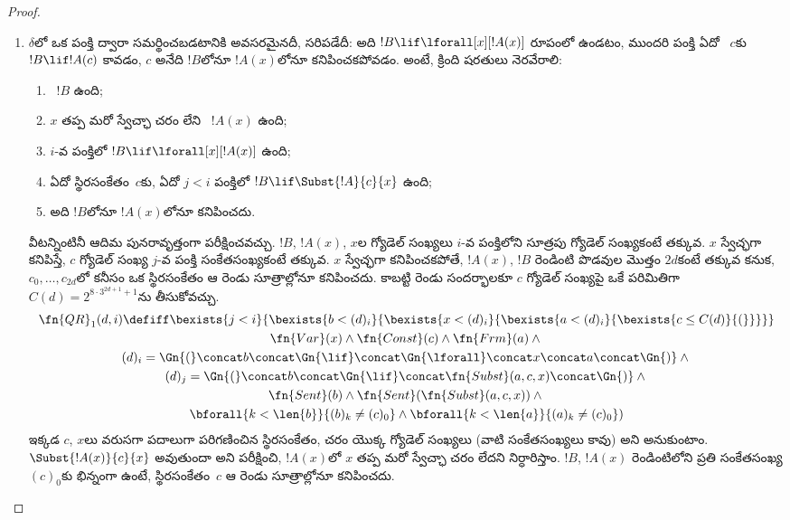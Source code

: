 \documentclass[../../../include/open-logic-section]{subfiles}
\begin{document}
\begin{proof}
\begin{enumerate}
  వాక్యం $!A\lif !B$, $i$-వ పంక్తిలోని వాక్యం $!B$ కావడం.
  \begin{multline*}
    \fn{MP}(d,i)\defiff\bexists{j<i}{\bexists{k<i}{}}\\
    (d)_k=\Gn{(}\concat(d)_j
      \concat\Gn{\lif}\concat(d)_i\concat\Gn{)}
  \end{multline*}
  పరిమిత పరిమాణీకరణ, సంయోజనం, $=$ అన్నీ ఆదిమ పునరావృత్తం కనుక, ఇది
  ఒక ఆదిమ పునరావృత్త సంబంధాన్ని నిర్వచిస్తుంది.
\item $\delta$లో ఒక పంక్తి \QR{} ద్వారా సమర్థించబడటానికి అవసరమైనదీ,
  సరిపడేదీ: అది $!B\lif\lforall[x][!A(x)]$ రూపంలో ఉండటం, ముందరి పంక్తి
  ఏదో ~$c$కు $!B\lif !A(c)$ కావడం,
  $c$ అనేది $!B$లోనూ $!A(x)$లోనూ కనిపించకపోవడం. అంటే, క్రింది షరతులు నెరవేరాలి:
  \begin{enumerate}
  \item {}~$!B$ ఉంది;
  \item $x$ తప్ప మరో స్వేచ్ఛా చరం లేని
    ~$!A(x)$ ఉంది;
  \item $i$-వ పంక్తిలో $!B\lif\lforall[x][!A(x)]$ ఉంది;
  \item ఏదో స్థిరసంకేతం~$c$కు, ఏదో $j<i$ పంక్తిలో
    $!B\lif\Subst{!A}{c}{x}$ ఉంది;
  \item అది $!B$లోనూ $!A(x)$లోనూ కనిపించదు.
  \end{enumerate}
  వీటన్నింటినీ ఆదిమ పునరావృత్తంగా పరీక్షించవచ్చు. $!B$, $!A(x)$, $x$ల
  గ్యోడెల్ సంఖ్యలు $i$-వ పంక్తిలోని సూత్రపు గ్యోడెల్ సంఖ్యకంటే తక్కువ.
  $x$ స్వేచ్ఛగా కనిపిస్తే, $c$ గ్యోడెల్ సంఖ్య $j$-వ పంక్తి సంకేతసంఖ్యకంటే
  తక్కువ. $x$ స్వేచ్ఛగా కనిపించకపోతే, $!A(x)$, $!B$ రెండింటి పొడవుల
  మొత్తం $2d$కంటే తక్కువ కనుక, $c_0,\dots,c_{2d}$లో కనీసం ఒక
  స్థిరసంకేతం ఆ రెండు సూత్రాల్లోనూ కనిపించదు. కాబట్టి రెండు సందర్భాలకూ
  $c$ గ్యోడెల్ సంఖ్యపై ఒకే పరిమితిగా $C(d)=2^{8\cdot3^{2d+1}+1}$ను
  తీసుకోవచ్చు.
  \begin{multline*}
    \fn{QR}_1(d,i)\defiff\bexists{j<i}{\bexists{b<(d)_i}{\bexists{x<(d)_i}{
        \bexists{a<(d)_i}{\bexists{c\leq C(d)}{(}}}}}\\
    \fn{Var}(x)\land\fn{Const}(c)\land\fn{Frm}(a)\land{}\\
    (d)_i=\Gn{(}\concat
    b\concat\Gn{\lif}\concat\Gn{\lforall}\concat x\concat a
    \concat\Gn{)}\land{}\\
    (d)_j=\Gn{(}\concat b\concat
    \Gn{\lif}\concat\fn{Subst}(a,c,x)\concat\Gn{)}\land{}\\
    \fn{Sent}(b)\land\fn{Sent}(\fn{Subst}(a,c,x))\land{}\\
    \bforall{k<\len{b}}{(b)_k\neq(c)_0}\land
    \bforall{k<\len{a}}{(a)_k\neq(c)_0})
  \end{multline*}
  ఇక్కడ $c$, $x$లు వరుసగా పదాలుగా పరిగణించిన స్థిరసంకేతం, చరం యొక్క
  గ్యోడెల్ సంఖ్యలు (వాటి సంకేతసంఖ్యలు కావు) అని అనుకుంటాం.
  $\Subst{!A(x)}{c}{x}$  అవుతుందా అని
  పరీక్షించి, $!A(x)$లో $x$ తప్ప మరో స్వేచ్ఛా చరం లేదని నిర్ధారిస్తాం.
  $!B$, $!A(x)$ రెండింటిలోని ప్రతి సంకేతసంఖ్య $(c)_0$కు భిన్నంగా
  ఉంటే, స్థిరసంకేతం~$c$ ఆ రెండు సూత్రాల్లోనూ కనిపించదు.


\end{enumerate}
\end{proof}
\end{document}
